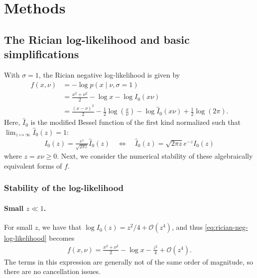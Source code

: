 \documentclass{article}
\begin{document}
\section{Methods}

\subsection{The Rician log-likelihood and basic simplifications}\label{sec:rician-log-likelihood-and-basic-simplifications}

With $\sigma=1$, the Rician negative log-likelihood is given by
%
\begin{align}
  f(x, \nu) & = -\log p(x \mid \nu, \sigma=1)                                                                                                                                \\
            & = \frac{x^2 + \nu^2}{2} - \log x - \log I_0(x \nu) \label{eq:rician-neg-log-likelihood}                                                                        \\
            & = \frac{(x-\nu)^2}{2} - \frac{1}{2}\log\left(\frac{x}{\nu}\right) - \log \hat{I}_0(x \nu) + \frac{1}{2}\log(2\pi). \label{eq:rician-neg-log-likelihood-scaled}
\end{align}
%
Here, $\hat{I}_0$ is the modified Bessel function of the first kind normalized such that $\lim_{z \mapsto \infty} \hat{I}_0(z) = 1$:
%
\begin{align}
  I_0(z) = \frac{e^z}{\sqrt{2\pi z}} \hat{I}_0(z) \quad \Leftrightarrow \quad \hat{I}_0(z) = \sqrt{2\pi z} e^{-z} I_0(z)
\end{align}
%
where $z = x\nu \ge 0$.
Next, we consider the numerical stability of these algebraically equivalent forms of $f$.

\subsubsection{Stability of the log-likelihood}

\paragraph{Small $z \ll 1$.}

For small $z$, we have that $\log I_0(z) = z^2/4 + \mathcal{O}(z^4)$, and thus \cref{eq:rician-neg-log-likelihood} becomes
%
\begin{align}
  f(x, \nu) = \frac{x^2 + \nu^2}{2} - \log x - \frac{z^2}{4} + \mathcal{O}(z^4).
\end{align}
%
The terms in this expression are generally not of the same order of magnitude, so there are no cancellation issues.
\end{document}
